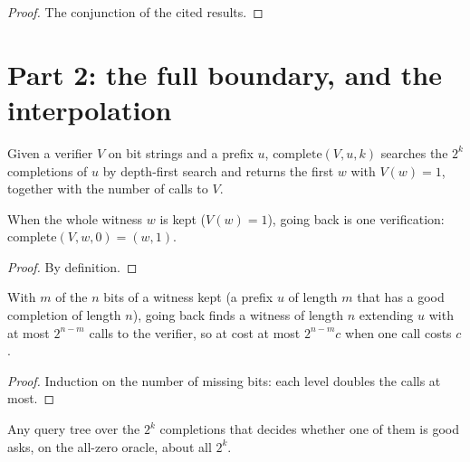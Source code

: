 \begin{proof}
  \leanok
  The conjunction of the cited results.
\end{proof}

\section{Part 2: the full boundary, and the interpolation}

\begin{definition}
  \label{def:complete}
  \leanok
  Given a verifier $V$ on bit strings and a prefix $u$, $\mathrm{complete}(V, u, k)$ searches the
  $2^k$ completions of $u$ by depth-first search and returns the first $w$ with $V(w) = 1$, together
  with the number of calls to $V$.
  \own{}
\end{definition}

\begin{theorem}
  \label{thm:full-boundary}
  \leanok
  When the whole witness $w$ is kept ($V(w) = 1$), going back is one verification:
  $\mathrm{complete}(V, w, 0) = (w, 1)$.
  \own{}
\end{theorem}

\begin{proof}
  \leanok
  By definition.
\end{proof}

\begin{theorem}
  \label{thm:interpolation}
  \leanok
  With $m$ of the $n$ bits of a witness kept (a prefix $u$ of length $m$ that has a good completion
  of length $n$), going back finds a witness of length $n$ extending $u$ with at most $2^{n-m}$ calls
  to the verifier, so at cost at most $2^{n-m} c$ when one call costs $c$.
  \own{}
\end{theorem}

\begin{proof}
  \leanok
  Induction on the number of missing bits: each level doubles the calls at most.
\end{proof}

\begin{theorem}
  \label{thm:boundary-lower-bound}
  \leanok
  Any query tree over the $2^k$ completions that decides whether one of them is good asks, on the
  all-zero oracle, about all $2^k$.
  \own{}
\end{theorem}

